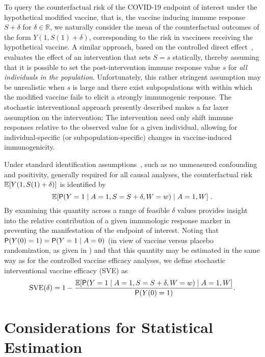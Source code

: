 To query the counterfactual risk of the COVID-19 endpoint of interest under the
hypothetical modified vaccine, that is, the vaccine inducing immune response $S
+ \delta$ for $\delta \in \mathbb{R}$, we naturally consider the mean of the
counterfactual outcomes of the form $Y(1, S(1) + \delta)$, corresponding to the
risk in vaccinees receiving the hypothetical vaccine. A similar approach, based
on the controlled direct effect~\citep{benkeser2021inference}, evaluates the
effect of an intervention that sets $S = s$ statically, thereby assuming that it
is possible to set the post-intervention immune response value $s$ for
\textit{all individuals in the population}. Unfortunately, this rather stringent
assumption may be unrealistic when $s$ is large and there exist subpopulations
with within which the modified vaccine fails to elicit a strongly immunogenic
response. The stochastic interventional approach presently described makes a far
laxer assumption on the intervention: The intervention need only
shift immune responses relative to the observed value for a given individual,
allowing for individual-specific (or subpopulation-specific) changes in
vaccine-induced immunogenicity.

Under standard identification assumptions~\citep{diaz2012population,
hejazi2020efficient}, such as no unmeasured confounding and positivity,
generally required for all causal analyses, the counterfactual risk
$\E[Y(1, S(1)
+ \delta)]$ is identified by
\begin{equation*}
  \E[\P(Y = 1 \mid A = 1, S = S + \delta, W = w) \mid A = 1, W] \ .
\end{equation*}
By examining this quantity across a range of feasible $\delta$ values provides
insight into the relative contribution of a given immunologic response marker in
preventing the manifestation of the endpoint of interest.
Noting that $\P(Y(0)=1) = \P(Y=1 \mid A=0)$ (in view of vaccine
versus placebo randomization, as given in \citep{gilbert2021assessment}) and
that
this quantity may
be estimated in the same way as for the controlled vaccine efficacy analyses,
we define
stochastic interventional vaccine efficacy (SVE) as
\begin{equation*}
\text{SVE}(\delta) = 1 - \frac{\E[\P(Y = 1 \mid A = 1, S = S + \delta, W = w)
\mid A = 1, W]}{\P(Y(0)=1)}.
\end{equation*}

\section{Considerations for Statistical Estimation}

